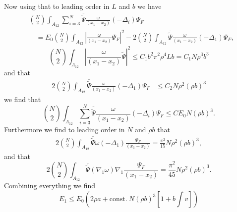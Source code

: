 \documentclass[a4paper,11pt]{article}
\numberwithin{equation}{section}
\begin{document}
		Now using that to leading order in $ L $ and $ b $ we have \begin{equation}
		\begin{aligned}
		&\binom{N}{2}\int_{A_{12}}\sum_{i=3}^{N} \overline{\tilde{\Psi}}\frac{\omega}{(x_1-x_2)}(-\Delta_i)\Psi_F\\&\quad=E_0\binom{N}{2}\int_{A_{12}}\left\lvert\frac{\omega}{(x_1-x_2)}\Psi_F\right\rvert^2-2\binom{N}{2}\int_{A_{12}} \overline{\tilde{\Psi}}\frac{\omega}{(x_1-x_2)}(-\Delta_1)\Psi_F,
		\end{aligned}
		\end{equation}
		\begin{equation}
		\binom{N}{2}\int_{A_{12}}\left\lvert\frac{\omega}{(x_1-x_2)}\tilde{\Psi}\right\rvert^2\leq C_1 b^2\pi^2\rho^4  L b=C_1N\rho^3 b^3
		\end{equation}
		and that \begin{equation}
		\begin{aligned}
		2\binom{N}{2}\int_{A_{12}} \overline{\tilde{\Psi}}\frac{\omega}{(x_1-x_2)}(-\Delta_1)\Psi_F&\leq C_2 N\rho^2(\rho b)^3
		\end{aligned}
		\end{equation}
		we find that \begin{equation}
		\binom{N}{2}\int_{A_{12}}\sum_{i=3}^{N} \overline{\tilde{\Psi}}\frac{\omega}{(x_1-x_2)}(-\Delta_i)\Psi_F\leq C E_0 N(\rho b)^3.
		\end{equation}
		Furthermore we find to leading order in $ N $ and $ \rho b $ that \begin{equation}
		\begin{aligned}
		2\binom{N}{2}\int_{A_{12}}\overline{\tilde{\Psi}}\omega(-\Delta_1)\frac{\Psi_F}{(x_1-x_2)}=\frac{\pi^2}{15}N\rho^2 (\rho b)^3,
		\end{aligned}
		\end{equation}
		and that \begin{equation}
		2\binom{N}{2}\int_{A_{12}}\overline{\tilde{\Psi}}(\nabla_1\omega)\nabla_1\frac{\Psi_F}{(x_1-x_2)}=\frac{\pi^2}{45}N\rho^2(\rho b)^3.
		\end{equation}
		Combining everything we find \begin{equation}
		E_1\leq E_0 \left(2\rho a+ \text{const.}\ N(\rho b)^3\left[ 1+ b\int v\right]\right)
		\end{equation}
\end{document}
